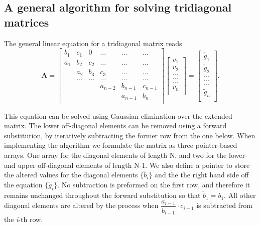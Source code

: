 \documentclass[%
reprint,
amsmath,amssymb,
aps,
]{revtex4-1}
\begin{document}
\subsection{A general algorithm for solving tridiagonal matrices}
\noindent The general linear equation for a tridiagonal matrix reads
\[
\mathbf{A} = \begin{bmatrix}
b_1& c_1 & 0 &\dots   & \dots &\dots \\
a_1 & b_2 & c_2 &\dots &\dots &\dots \\
& a_2 & b_3 & c_3 & \dots & \dots \\
& \dots   & \dots &\dots   &\dots & \dots \\
&   &  &a_{n-2}  &b_{n-1}& c_{n-1} \\
&    &  &   &a_{n-1} & b_n \\
\end{bmatrix}\begin{bmatrix}
v_1\\
v_2\\
\dots \\
\dots  \\
\dots \\
v_n\\
\end{bmatrix}
=\begin{bmatrix}
\tilde{g}_1\\
\tilde{g}_2\\
\dots \\
\dots \\
\dots \\
\tilde{g}_n\\
\end{bmatrix}.
\]

\noindent This equation can be solved using Gaussian elimination over the extended matrix. The lower off-diagonal elements can be removed using a forward substitution, by iteratively subtracting the former row from the one below. When implementing the algorithm we formulate the matrix as three pointer-based arrays. One array for the diagonal elements of length N, and two for the lower- and upper off-diagonal elements of length N-1. We also define a pointer to store the altered values for the diagonal elements $\{\tilde{b}_i\}$ and the the right hand side off the equation $\{\tilde{g}_i \}$. No subtraction is preformed on the first row, and therefore it remains unchanged throughout the forward substitution so that $\tilde{b}_1 = b_1 $. All other diagonal elements are altered by the process when $\dfrac{a_{i-1}}{b_{i-1}}\cdot c_{i-1}$ is subtracted from the \textit{i}-th row.  
\end{document}
